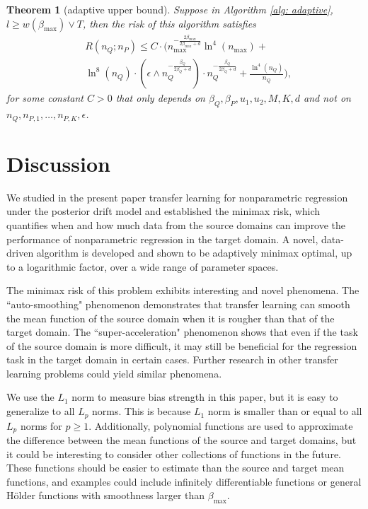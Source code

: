 \documentclass{article}
\def\holder{H\"{o}lder }
\def\bmax{\beta_{\max}}
\newtheorem{theorem}{Theorem}
\begin{document}
\begin{theorem}[adaptive upper bound]\label{th: adaptive multi}
Suppose in Algorithm \ref{alg: adaptive}, $l\geq w(\beta_{\max})\vee T$, then the risk of this algorithm satisfies
\begin{align*}
&R(n_Q;n_{P})\leq C\cdot\bigg( n_{\max}^{-\frac{2\bmax}{2\bmax+d}}\ln^4(n_{\max})+ \\
&\ln^8(n_Q)\cdot(\epsilon \wedge n_Q^{-\frac{\beta_Q}{2\beta_Q+d}})\cdot n_Q^{-\frac{\beta_Q}{2\beta_Q+d}}+\frac{\ln^4(n_Q)}{n_Q}\bigg),    
\end{align*}
for some constant $C>0$ that only depends on $\beta_Q,\beta_P,u_1,u_2,M,K,d$ and not on $n_Q,n_{P,1},\dots,n_{P,K},\epsilon$.
\end{theorem}



\section{Discussion}
\label{section: discussion}

We studied in the present paper transfer learning for nonparametric regression under the posterior drift model and established the minimax risk, which quantifies when and how much data from the source domains can improve the performance of nonparametric regression in the target domain. A novel, data-driven algorithm is developed and shown to be adaptively minimax optimal, up to a logarithmic factor, over a wide range of parameter spaces.

The minimax risk of this problem exhibits interesting and novel phenomena. The ``auto-smoothing" phenomenon demonstrates that transfer learning can smooth the mean function of the source domain when it is rougher than that of the target domain. The ``super-acceleration" phenomenon shows that even if the task of the source domain is more difficult, it may still be beneficial for the regression task in the target domain in certain cases. Further research in other transfer learning problems could yield similar phenomena.

We use the $L_1$ norm to measure bias strength in this paper, but it is easy to generalize to all $L_p$ norms. This is because $L_1$ norm is smaller than or equal to all $L_p$ norms for $p\geq 1$.  Additionally, polynomial functions are used to approximate the difference between the mean functions of the source and target domains, but it could be interesting to consider other collections of functions in the future. These functions should be easier to estimate than the source and target mean functions, and examples could include infinitely differentiable functions or general \holder  functions with smoothness larger than $\beta_{\max}$.
\end{document}
